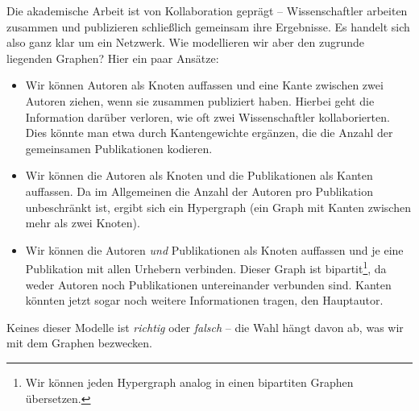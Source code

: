 \begin{example}
    Die akademische Arbeit ist von Kollaboration geprägt -- Wissenschaftler arbeiten zusammen und publizieren schließlich gemeinsam ihre Ergebnisse.
    Es handelt sich also ganz klar um ein Netzwerk.
    Wie modellieren wir aber den zugrunde liegenden Graphen?
    Hier ein paar Ansätze:

    \begin{itemize}
        \item
              Wir können Autoren als Knoten auffassen und eine Kante zwischen zwei Autoren ziehen, wenn sie zusammen publiziert haben.
              Hierbei geht die Information darüber verloren, wie oft zwei Wissenschaftler kollaborierten.
              Dies könnte man etwa durch Kantengewichte ergänzen, die die Anzahl der gemeinsamen Publikationen kodieren.

        \item Wir können die Autoren als Knoten und die Publikationen als Kanten auffassen.
              Da im Allgemeinen die Anzahl der Autoren pro Publikation unbeschränkt ist, ergibt sich ein Hypergraph (ein Graph mit Kanten zwischen mehr als zwei Knoten).

        \item Wir können die Autoren \emph{und} Publikationen als Knoten auffassen und je eine Publikation mit allen Urhebern verbinden.
              Dieser Graph ist bipartit\footnote{Wir können jeden Hypergraph analog in einen bipartiten Graphen übersetzen.}, da weder Autoren noch Publikationen untereinander verbunden sind.
              Kanten könnten jetzt sogar noch weitere Informationen tragen, \zB den Hauptautor.\qedhere
    \end{itemize}
\end{example}

\noindent
Keines dieser Modelle ist \emph{richtig} oder \emph{falsch} -- die Wahl hängt davon ab, was wir mit dem Graphen bezwecken.

